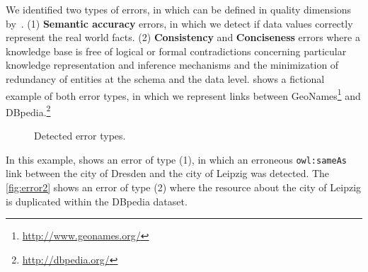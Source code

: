 We identified two types of errors, in which can be defined in quality dimensions by~\cite{zaveri2015quality}. (1) \textbf{Semantic accuracy} errors, in which we detect if data values correctly represent the real world facts. (2) \textbf{Consistency} and \textbf{Conciseness} errors where a knowledge base is free of logical or formal contradictions concerning particular knowledge representation and inference mechanisms and the minimization of redundancy of entities at the schema and the data level. 
 shows a fictional example of both error types, in which we represent links between  GeoNames\footnote{\url{http://www.geonames.org/}} and DBpedia.\footnote{\url{http://dbpedia.org/}}
\begin{figure}[H]
	\centering
	\caption{Detected error types.}
	\label{fig:errorType}
\end{figure}
%
In this example,  shows an error of type (1), in which an erroneous \texttt{owl:sameAs} link between the city of Dresden and the city of Leipzig was detected. The \cref{fig:error2} shows an error of type (2) where the resource about the city of Leipzig is duplicated within the DBpedia dataset. 

